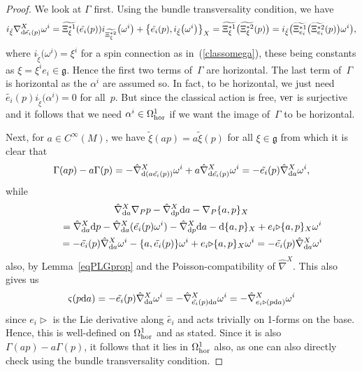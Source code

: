 \documentclass[pdftex]{sigma}
\numberwithin{equation}{section}
\newcommand{\<}{{\langle}}
\renewcommand{\>}{{\rangle}}
\newcommand{\extd}{{\rm d}}
\newcommand{\la}{{\triangleright}}
\newcommand{\cg}{{\mathfrak{g}}}
\newcommand{\ver}{{\rm ver}}
\begin{document}
\begin{proof} We look at $\Gamma$ first. Using the bundle transversality condition, we have
\[ i_{\tilde\xi}\nabla^X_{\extd \tilde{e_i}(p)}\omega^i=\widetilde{\Xi_\xi^{*1}}(\tilde{e_i}(p)) i_{\widetilde{\Xi_\xi^{*2}}}\big(\omega^i\big)+\big\{\tilde{e_i}(p),i_{\tilde\xi}\big(\omega^i\big)\big\}_X =\widetilde{\Xi_\xi^{*1}}\big({\widetilde{\Xi_\xi^{*2}}}(p)\big)=i_{\tilde\xi}\big(\widetilde{\Xi_{e_i}^{*1}} \big({\widetilde{\Xi_{e_i}^{*2}}}(p)\big)\omega^i\big),\]
where $i_{\tilde\xi}\big(\omega^i\big)=\xi^i$ for a spin connection as in~(\ref{classomega}), these being constants as $\xi=\xi^ie_i\in\cg$. Hence the first two terms of~$\Gamma$ are horizontal. The last term of~$\Gamma$ is horizontal as the $\alpha^i$ are assumed so. In fact, to be horizontal, we just need $\tilde{e_i}(p)i_{\tilde\xi}\big(\alpha^i\big)=0$ for all~$p$. But since the classical action is free, $\ver$ is surjective and it follows that we need $\alpha^i\in \Omega^1_{\rm hor}$ if we want the image of~$\Gamma$ to be horizontal.

Next, for $a\in C^\infty(M)$, we have $\tilde\xi(ap)=a\tilde\xi(p)$ for all $\xi\in \cg$ from which it is clear that
\[ \Gamma(ap)-a\Gamma(p)=-\hat\nabla^X_{\extd(a\tilde{e_i}(p))}\omega^i+a\hat\nabla^X_{\extd\tilde{e_i}(p)}\omega^i=-\tilde{e_i}(p)\hat\nabla^X_{\extd a}\omega^i,\]
while
\begin{gather*}\hat\nabla^X_{\extd a}\nabla_Pp-\hat\nabla^X_{\extd p}\extd a -\nabla_P\{a,p\}_X\\
\qquad{} =\hat\nabla^X_{\extd a}\extd p-\hat\nabla^X_{\extd a}(\tilde{e_i}(p)\omega^i)-\hat\nabla^X_{\extd p}\extd a-\extd\{a,p\}_X+e_i\la\{a,p\}_X\omega^i\\
\qquad{} =-\tilde{e_i}(p)\hat\nabla^X_{\extd a}\omega^i-\{a,\tilde{e_i}(p)\}\omega^i +e_i\la\{a,p\}_X\omega^i=-\tilde{e_i}(p)\hat\nabla^X_{\extd a}\omega^i\end{gather*}
also, by Lemma~\ref{eqPLGprop} and the Poisson-compatibility of $\hat\nabla^X$. This also gives us \[ \varsigma(p\extd a) =-\tilde{e_i}(p)\hat\nabla^X_{\extd a}\omega^i =-\hat\nabla^X_{\tilde{e_i}(p)\extd a}\omega^i =-\hat\nabla^X_{e_i\la(p\extd a)}\omega^i\]
since $e_i\la$ is the Lie derivative along $\tilde{e_i}$ and acts trivially on 1-forms on the base. Hence, this is well-defined on $\Omega^1_{\rm hor}$ and as stated. Since it is also $\Gamma(ap)-a\Gamma(p)$, it follows that it lies in $\Omega^1_{\rm hor}$ also, as one can also directly check using the bundle transversality condition.


\end{proof}
\end{document}
